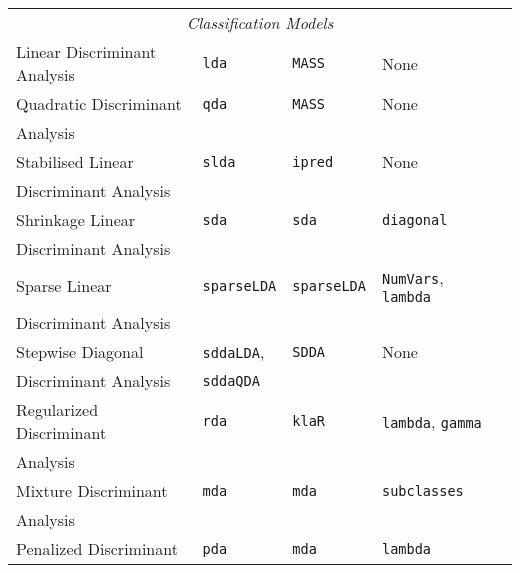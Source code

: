 \documentclass[12pt]{article}
\begin{document}
\begin{longtable}{lllll}
\multicolumn{5}{c}{{{\em Classification Models}}} \\ 
      Linear Discriminant Analysis &
         \texttt{lda} & 
            \texttt{MASS}       &          
            None\\
            
      Quadratic Discriminant  &
         \texttt{qda} & 
            \texttt{MASS}       &          
            None\\  
      \:\:  Analysis & & &\\               
            
      Stabilised Linear &
         \texttt{slda} & 
            \texttt{ipred}       &          
            None\\  
      \:\: Discriminant Analysis & & &\\            
            
      Shrinkage Linear &
         \texttt{sda} & 
            \texttt{sda}       &          
            \texttt{diagonal}\\  
      \:\: Discriminant Analysis & & &\\
      
      Sparse Linear &
         \texttt{sparseLDA} & 
            \texttt{sparseLDA}       &          
            \texttt{NumVars}, \texttt{lambda} \\  
      \:\: Discriminant Analysis & & &\\      
      
      Stepwise Diagonal &
        \texttt{sddaLDA}, &
        \texttt{SDDA} &
        None \\
      \:\: Discriminant Analysis & \texttt{sddaQDA} & &\\
            
      Regularized Discriminant  &
         \texttt{rda} & 
            \texttt{klaR}       & 
            \texttt{lambda}, \texttt{gamma} & \\
      \: \: Analysis \\
      
      Mixture Discriminant  &
         \texttt{mda} & 
            \texttt{mda}       & 
            \texttt{subclasses} & \\
      \: \: Analysis \\      
                     
      Penalized Discriminant  &
         \texttt{pda} & 
            \texttt{mda}       & 
            \texttt{lambda} & \\
      

\end{longtable}
\end{document}
